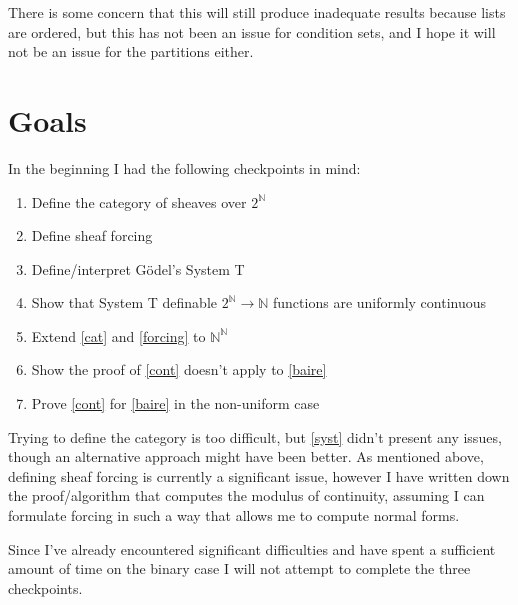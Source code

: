 \documentclass{article}
\begin{document}
There is some concern that this will still produce inadequate results because
lists are ordered, but this has not been an issue for condition sets, and I hope
it will not be an issue for the partitions either.

\section{Goals}

In the beginning I had the following checkpoints in mind:
\begin{enumerate}[(1)]
	\item\label{cat} Define the category of sheaves over $2^ℕ$
	\item\label{forcing} Define sheaf forcing
	\item\label{syst} Define/interpret Gödel's System T
	\item\label{cont} Show that System T definable $2^ℕ → ℕ$ functions are uniformly continuous
	\item\label{baire} Extend \ref{cat} and \ref{forcing} to $ℕ^ℕ$
	\item Show the proof of \ref{cont} doesn't apply to \ref{baire}
	\item Prove \ref{cont} for \ref{baire} in the non-uniform case
\end{enumerate}

Trying to define the category is too difficult, but \ref{syst} didn't present
any issues, though an alternative approach might have been better. As mentioned
above, defining sheaf forcing is currently a significant issue, however I have
written down the proof/algorithm that computes the modulus of continuity,
assuming I can formulate forcing in such a way that allows me to compute normal
forms.

Since I've already encountered significant difficulties and have spent a
sufficient amount of time on the binary case I will not attempt to complete
the three checkpoints.

\printbibliography
\end{document}
